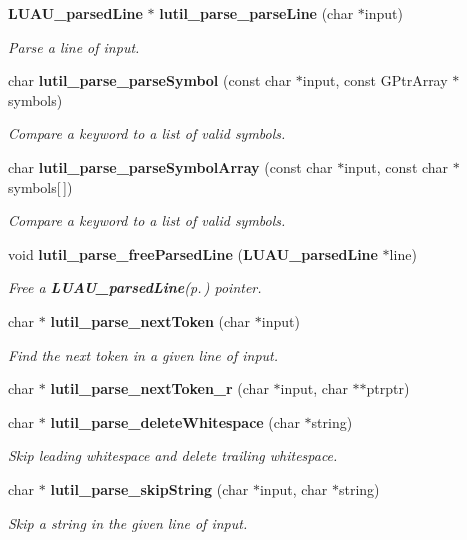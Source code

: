 \begin{CompactItemize}
\item 
{\bf LUAU\_\-parsed\-Line} $\ast$ {\bf lutil\_\-parse\_\-parse\-Line} (char $\ast$input)
\begin{CompactList}\small\item\em Parse a line of input. \item\end{CompactList}\item 
char {\bf lutil\_\-parse\_\-parse\-Symbol} (const char $\ast$input, const GPtr\-Array $\ast$symbols)
\begin{CompactList}\small\item\em Compare a keyword to a list of valid symbols. \item\end{CompactList}\item 
char {\bf lutil\_\-parse\_\-parse\-Symbol\-Array} (const char $\ast$input, const char $\ast$symbols[$\,$])
\begin{CompactList}\small\item\em Compare a keyword to a list of valid symbols. \item\end{CompactList}\item 
void {\bf lutil\_\-parse\_\-free\-Parsed\-Line} ({\bf LUAU\_\-parsed\-Line} $\ast$line)
\begin{CompactList}\small\item\em Free a {\bf LUAU\_\-parsed\-Line}{\rm (p.\,\pageref{structLUAU__parsedLine})} pointer. \item\end{CompactList}\item 
char $\ast$ {\bf lutil\_\-parse\_\-next\-Token} (char $\ast$input)
\begin{CompactList}\small\item\em Find the next token in a given line of input. \item\end{CompactList}\item 
char $\ast$ {\bf lutil\_\-parse\_\-next\-Token\_\-r} (char $\ast$input, char $\ast$$\ast$ptrptr)
\item 
char $\ast$ {\bf lutil\_\-parse\_\-delete\-Whitespace} (char $\ast$string)
\begin{CompactList}\small\item\em Skip leading whitespace and delete trailing whitespace. \item\end{CompactList}\item 
char $\ast$ {\bf lutil\_\-parse\_\-skip\-String} (char $\ast$input, char $\ast$string)
\begin{CompactList}\small\item\em Skip a string in the given line of input. \item\end{CompactList}\end{CompactItemize}


